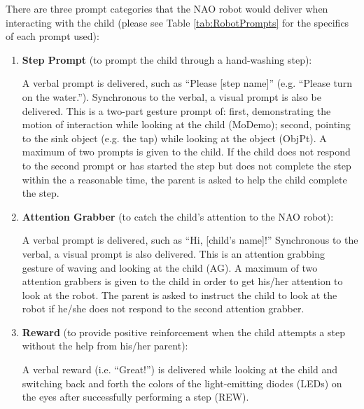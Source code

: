 There are three prompt categories that the NAO robot would deliver when interacting with the child (please see Table \ref{tab:RobotPrompts} for the specifics of each prompt used):
\begin{enumerate}
	\item \textbf{Step Prompt} (to prompt the child through a hand-washing step):
	
	A verbal prompt is delivered, such as “Please [step name]” (e.g. “Please turn on the water.”).  Synchronous to the verbal, a visual prompt is also be delivered. This is a two-part gesture prompt of: first, demonstrating the motion of interaction while looking at the child (MoDemo); second, pointing to the sink object (e.g. the tap) while looking at the object (ObjPt). A maximum of two prompts is given to the child. If the child does not respond to the second prompt or has started the step but does not complete the step within the a reasonable time, the parent is asked to help the child complete the step. 
	
	\item \textbf{Attention Grabber} (to catch the child's attention to the NAO robot): 
	
	A verbal prompt is delivered, such as “Hi, [child's name]!”  Synchronous to the verbal, a visual prompt is also delivered. This is an attention grabbing gesture of waving and looking at the child (AG). A maximum of two attention grabbers is given to the child in order to get his/her attention to look at the robot.  The parent is asked to instruct the child to look at the robot if he/she does not respond to the second attention grabber. 
	
	\item \textbf{Reward} (to provide positive reinforcement when the child attempts a step without the help from his/her parent): 
	
	A verbal reward (i.e. “Great!”) is delivered while looking at the child and switching back and forth the colors of the light-emitting diodes (LEDs) on the eyes after successfully performing a step (REW).
\end{enumerate}
